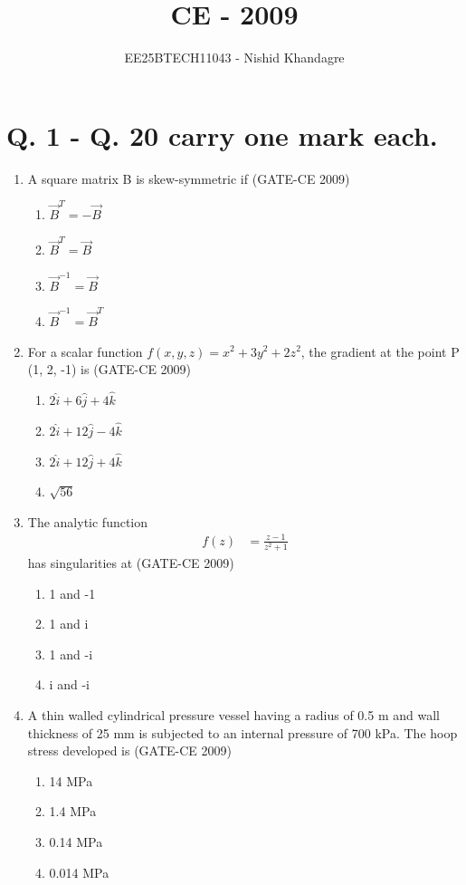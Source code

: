 \documentclass[journal,12pt,onecolumn]{article}
\theoremstyle{remark}
\begin{document}
\title{CE - 2009}
\author{EE25BTECH11043 - Nishid Khandagre}
\date{}
\maketitle

\renewcommand{\thefigure}{\theenumi}
\renewcommand{\thetable}{\theenumi}


\section*{Q. 1 - Q. 20 carry one mark each.}
\begin{enumerate}
    \item A square matrix B is skew-symmetric if (GATE-CE 2009)
    \begin{enumerate}
        \item $\vec{B}^T = -\vec{B}$ 
        \item $\vec{B}^T = \vec{B}$ 
        \item $\vec{B}^{-1} = \vec{B}$ 
        \item $\vec{B}^{-1} = \vec{B}^T$
    \end{enumerate}
    
    \item For a scalar function $f(x, y, z) = x^2 + 3y^2 + 2z^2$, the gradient at the point P (1, 2, -1) is (GATE-CE 2009)
    \begin{enumerate}
        \item $2\hat{i} + 6\hat{j}+ 4\hat{k}$
        \item $2\hat{i} + 12\hat{j} - 4\hat{k}$
        \item $2\hat{i} + 12\hat{j} + 4\hat{k}$
        \item $\sqrt{56}$
    \end{enumerate}
    
    \item The analytic function
\begin{align}
f(z) &= \frac{z-1}{z^2+1}
\end{align}
has singularities at (GATE-CE 2009)
    \begin{enumerate}
        \item 1 and -1 
        \item 1 and i 
        \item 1 and -i 
        \item i and -i
    \end{enumerate}
    
    \item A thin walled cylindrical pressure vessel having a radius of 0.5 m and wall thickness of 25 mm is subjected to an internal pressure of 700 kPa. The hoop stress developed is (GATE-CE 2009)
    \begin{enumerate}
        \item 14 MPa 
        \item 1.4 MPa 
        \item 0.14 MPa 
        \item 0.014 MPa
    \end{enumerate}
    

\end{enumerate}
\end{document}
